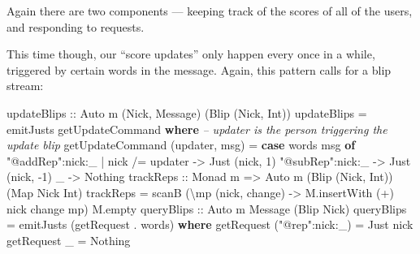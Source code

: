\documentclass[]{article}
\newenvironment{Shaded}{}{}
\newcommand{\KeywordTok}[1]{\textcolor[rgb]{0.00,0.44,0.13}{\textbf{{#1}}}}
\newcommand{\DataTypeTok}[1]{\textcolor[rgb]{0.56,0.13,0.00}{{#1}}}
\newcommand{\DecValTok}[1]{\textcolor[rgb]{0.25,0.63,0.44}{{#1}}}
\newcommand{\StringTok}[1]{\textcolor[rgb]{0.25,0.44,0.63}{{#1}}}
\newcommand{\CommentTok}[1]{\textcolor[rgb]{0.38,0.63,0.69}{\textit{{#1}}}}
\newcommand{\OtherTok}[1]{\textcolor[rgb]{0.00,0.44,0.13}{{#1}}}
\newcommand{\FunctionTok}[1]{\textcolor[rgb]{0.02,0.16,0.49}{{#1}}}
\newcommand{\NormalTok}[1]{{#1}}
\begin{document}
Again there are two components --- keeping track of the scores of all of
the users, and responding to requests.

This time though, our ``score updates'' only happen every once in a
while, triggered by certain words in the message. Again, this pattern
calls for a blip stream:

\begin{Shaded}
\begin{Highlighting}[]
\OtherTok{    updateBlips ::} \DataTypeTok{Auto} \NormalTok{m (}\DataTypeTok{Nick}\NormalTok{, }\DataTypeTok{Message}\NormalTok{) (}\DataTypeTok{Blip} \NormalTok{(}\DataTypeTok{Nick}\NormalTok{, }\DataTypeTok{Int}\NormalTok{))}
    \NormalTok{updateBlips }\FunctionTok{=} \NormalTok{emitJusts getUpdateCommand}
      \KeywordTok{where}
        \CommentTok{-- updater is the person triggering the update blip}
        \NormalTok{getUpdateCommand (updater, msg) }\FunctionTok{=}
          \KeywordTok{case} \NormalTok{words msg }\KeywordTok{of}
            \StringTok{"@addRep"}\FunctionTok{:}\NormalTok{nick}\FunctionTok{:}\NormalTok{_ }\FunctionTok{|} \NormalTok{nick }\FunctionTok{/=} \NormalTok{updater }\OtherTok{->} \DataTypeTok{Just} \NormalTok{(nick, }\DecValTok{1}\NormalTok{)}
            \StringTok{"@subRep"}\FunctionTok{:}\NormalTok{nick}\FunctionTok{:}\NormalTok{_                   }\OtherTok{->} \DataTypeTok{Just} \NormalTok{(nick, }\FunctionTok{-}\DecValTok{1}\NormalTok{)}
            \NormalTok{_                                  }\OtherTok{->} \DataTypeTok{Nothing}
\OtherTok{    trackReps ::} \DataTypeTok{Monad} \NormalTok{m }\OtherTok{=>} \DataTypeTok{Auto} \NormalTok{m (}\DataTypeTok{Blip} \NormalTok{(}\DataTypeTok{Nick}\NormalTok{, }\DataTypeTok{Int}\NormalTok{)) (}\DataTypeTok{Map} \DataTypeTok{Nick} \DataTypeTok{Int}\NormalTok{)}
    \NormalTok{trackReps }\FunctionTok{=} \NormalTok{scanB (\textbackslash{}mp (nick, change) }\OtherTok{->} \NormalTok{M.insertWith (}\FunctionTok{+}\NormalTok{) nick change mp) M.empty}
\OtherTok{    queryBlips ::} \DataTypeTok{Auto} \NormalTok{m }\DataTypeTok{Message} \NormalTok{(}\DataTypeTok{Blip} \DataTypeTok{Nick}\NormalTok{)}
    \NormalTok{queryBlips }\FunctionTok{=} \NormalTok{emitJusts (getRequest }\FunctionTok{.} \NormalTok{words)}
      \KeywordTok{where}
        \NormalTok{getRequest (}\StringTok{"@rep"}\FunctionTok{:}\NormalTok{nick}\FunctionTok{:}\NormalTok{_) }\FunctionTok{=} \DataTypeTok{Just} \NormalTok{nick}
        \NormalTok{getRequest _                }\FunctionTok{=} \DataTypeTok{Nothing}




\end{Highlighting}
\end{Shaded}
\end{document}

